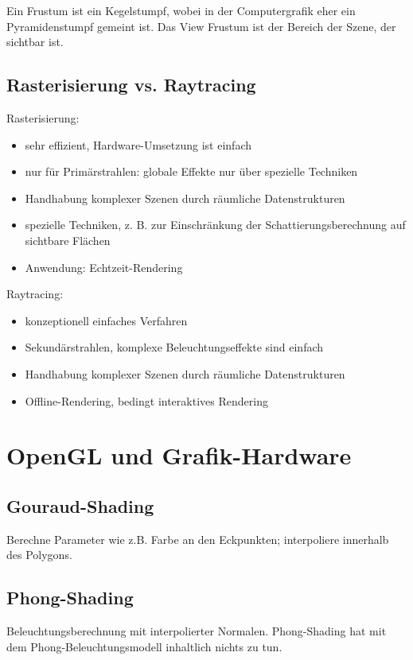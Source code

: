 \documentclass[paper=a4, fontsize=11pt]{scrartcl} %
\numberwithin{equation}{section} %
\numberwithin{figure}{section} %
\numberwithin{table}{section} %
\begin{document}
Ein Frustum ist ein Kegelstumpf, wobei in der Computergrafik eher ein Pyramidenstumpf gemeint ist. Das View Frustum ist der Bereich der Szene, der sichtbar ist.

\subsection{Rasterisierung vs. Raytracing}

Rasterisierung:
\begin{itemize}
\item sehr effizient, Hardware-Umsetzung ist einfach
\item nur für Primärstrahlen: globale Effekte nur über spezielle Techniken
\item Handhabung komplexer Szenen durch räumliche Datenstrukturen
\item spezielle Techniken, z. B. zur Einschränkung der Schattierungsberechnung auf sichtbare Flächen
\item Anwendung: Echtzeit-Rendering
\end{itemize}

Raytracing:
\begin{itemize}
\item konzeptionell einfaches Verfahren
\item Sekundärstrahlen, komplexe Beleuchtungseffekte sind einfach
\item Handhabung komplexer Szenen durch räumliche Datenstrukturen
\item Offline-Rendering, bedingt interaktives Rendering
\end{itemize}

\section{OpenGL und Grafik-Hardware}

\subsection{Gouraud-Shading}

Berechne Parameter wie z.B. Farbe an den Eckpunkten; interpoliere innerhalb des Polygons.

\subsection{Phong-Shading}

Beleuchtungsberechnung mit interpolierter Normalen. Phong-Shading hat mit dem Phong-Beleuchtungsmodell inhaltlich nichts zu tun.
\end{document}
